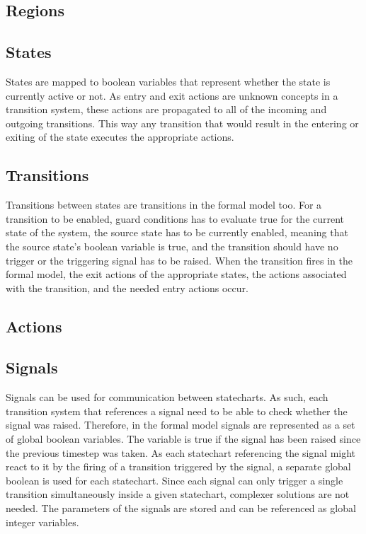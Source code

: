 {  \subsection{Regions}
  \subsection{States}
States are mapped to boolean variables that represent whether the state is currently active or not. As entry and exit actions are unknown concepts in a transition system, these actions are propagated to all of the incoming and outgoing transitions. This way any transition that would result in the entering or exiting of the state executes the appropriate actions.
  \subsection{Transitions}
Transitions between states are transitions in the formal model too. For a transition to be enabled, guard conditions has to evaluate true for the current state of the system, the source state has to be currently enabled, meaning that the source state's boolean variable is true, and the transition should have no trigger or the triggering signal has to be raised. When the transition fires in the formal model, the exit actions of the appropriate states, the actions associated with the transition, and the needed entry actions occur.
  \subsection{Actions}
  \subsection{Signals}
Signals can be used for communication between statecharts. As such, each transition system that references a signal need to be able to check whether the signal was raised. Therefore, in the formal model signals are represented as a set of global boolean variables. The variable is true if the signal has been raised since the previous timestep was taken. As each statechart referencing the signal might react to it by the firing of a transition triggered by the signal, a separate global boolean is used for each statechart. Since each signal can only trigger a single transition simultaneously inside a given statechart, complexer solutions are not needed. The parameters of the signals are stored and can be referenced as global integer variables.
}
